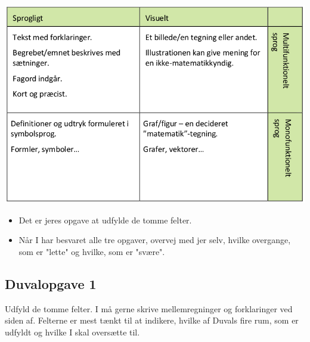 \documentclass[a4paper, 12pt]{article}
\begin{document}
\begin{center}
\includegraphics[width=.9\linewidth]{img/duval.png}
\end{center}

\begin{itemize}
\item Det er jeres opgave at udfylde de tomme felter.

\item Når I har besvaret alle tre opgaver, overvej med jer selv, hvilke overgange, som er "lette" og hvilke, som er "svære".
\end{itemize}

\newpage

\subsection*{Duvalopgave 1}
\label{sec:orgd152237}

Udfyld de tomme felter. I må gerne skrive mellemregninger og forklaringer ved siden af. Felterne er mest tænkt til at indikere, hvilke af Duvals fire rum, som er udfyldt og hvilke I skal oversætte til.
\end{document}
